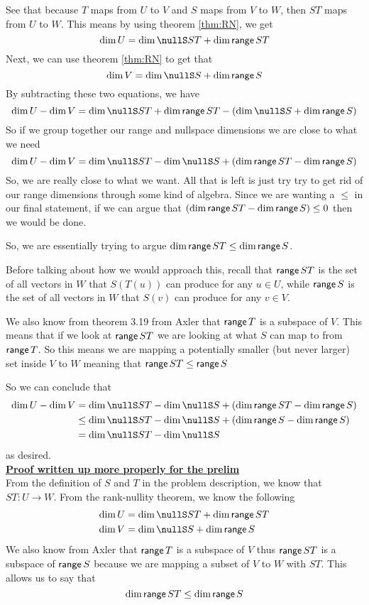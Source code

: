 \documentclass[answers]{exam}
\begin{document}
\begin{questions}
\begin{solution}
        See that because $T$ maps from $U$ to $V$ and $S$ maps from $V$ to $W$, then $ST$ maps from $U$ to $W$. This means by using theorem \ref{thm:RN}, we get
        \[
            \dim U = \dim\nullS ST + \dim\range ST
        \]
        Next, we can use theorem \ref{thm:RN} to get that
        \[
            \dim V = \dim\nullS S + \dim\range S
        \]
        By subtracting these two equations, we have
        \[
            \dim U - \dim V = \dim\nullS ST + \dim\range ST - \left(\dim\nullS S + \dim\range S\right)
        \]
        So if we group together our range and nullspace dimensions we are close to what we need
        \[
            \dim U - \dim V = \dim\nullS ST - \dim\nullS S + \left(\dim\range ST - \dim\range S\right)
        \]
        So, we are really close to what we want. All that is left is just try try to get rid of our range dimensions through some kind of algebra. Since we are wanting a $\leq$ in our final statement, if  we can argue that 
        $ \left(\text{dim}\,\mathsf{range}\, ST - \text{dim}\,\mathsf{range}\, S\right) \leq 0 $ then we would be done.

        So, we are essentially trying to argue $\text{dim}\,\mathsf{range}\, ST \leq \text{dim}\,\mathsf{range}\, S$. 

        Before talking about how we would approach this, recall that $\mathsf{range}\, ST$ is the set of all
        vectors in $W$ that $S(T(u))$ can produce for any $u\in U$, while $\mathsf{range}\, S$ is the set of all
        vectors in $W$ that $S(v)$ can produce for any $v\in V$. 

        We also know from theorem 3.19 from Axler that $\mathsf{range}\, T$ is a subspace of $V$. This means that if we look 
        at $\mathsf{range}\, ST$ we are looking at what $S$ can map to from $\mathsf{range}\, T$. So this means we are mapping
        a potentially smaller (but never larger) set inside $V$ to $W$ meaning that $\mathsf{range}\, ST \leq \mathsf{range}\, S$

        So we can conclude that
        \begin{align*}
            \dim U - \dim V &= \dim\nullS ST - \dim\nullS S + \left(\dim\range ST - \dim\range S\right) \\
            &\leq \dim\nullS ST - \dim\nullS S + \left(\dim\range S - \dim\range S\right) \\
            &= \dim\nullS ST - \dim\nullS S
        \end{align*}
        as desired.
        \\\underline{\textbf{Proof written up more properly for the prelim}}\\
        From the definition of $S$ and $T$ in the problem description, we know that $ST:U\rightarrow W$. From the rank-nullity theorem, we know the following
        \begin{align*}
            \dim U &= \dim\nullS ST + \dim\range ST \\
            \dim V &= \dim\nullS S + \dim\range S
        \end{align*}
        We also know from Axler that $\mathsf{range}\, T$ is a subspace of $V$ thus $\mathsf{range}\, ST$ is a subspace of $\mathsf{range}\, S$
        because we are mapping a subset of $V$ to $W$ with $ST$. This allows us to say that
        \[
            \text{dim}\,\mathsf{range}\, ST \leq \text{dim}\,\mathsf{range}\, S
        \]


\end{solution}
\end{questions}
\end{document}
